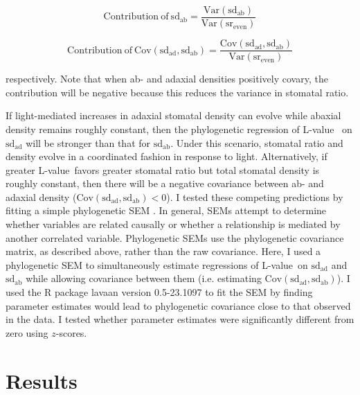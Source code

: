 \documentclass[12pt, oneside]{article}
\newcommand{\pkg}[1]{{\fontseries{b}\selectfont #1}}
\newcommand{\el}{L-value}
\begin{document}
\begin{equation} \label{eq:contribution_ab}
 \mathrm{Contribution~of~sd_{ab}} = \frac{\mathrm{Var(sd_{ab})}}{\mathrm{Var(sr_{even})}}
\end{equation}

\begin{equation} \label{eq:contribution_cov}
 \mathrm{Contribution~of~Cov(sd_{ad}, sd_{ab})} = \frac{\mathrm{Cov(sd_{ad}, sd_{ab})}}{\mathrm{Var(sr_{even})}}
\end{equation}

respectively. Note that when ab- and adaxial densities positively covary, the contribution will be negative because this reduces the variance in stomatal ratio.

If light-mediated increases in adaxial stomatal density can evolve while abaxial density remains roughly constant, then the phylogenetic regression of \el~ on $\mathrm{sd_{ad}}$ will be stronger than that for $\mathrm{sd_{ab}}$. Under this scenario, stomatal ratio and density evolve in a coordinated fashion in response to light. Alternatively, if greater \el~favors greater stomatal ratio but total stomatal density is roughly constant, then there will be a negative covariance between ab- and adaxial density ($\mathrm{Cov(sd_{ad}, sd_{ab}) < 0}$). I tested these competing predictions by fitting a simple phylogenetic SEM \citep[see][for a similar approach]{Mason_etal_2016}. In general, SEMs attempt to determine whether variables are related causally or whether a relationship is mediated by another correlated variable. Phylogenetic SEMs use the phylogenetic covariance matrix, as described above, rather than the raw covariance. Here, I used a phylogenetic SEM to simultaneously estimate regressions of \el~on $\mathrm{sd_{ad}}$ and $\mathrm{sd_{ab}}$ while allowing covariance between them (i.e. estimating $\mathrm{Cov(sd_{ad}, sd_{ab})}$). I used the R package \pkg{lavaan} version 0.5-23.1097 \citep{Rosseel_2012} to fit the SEM by finding parameter estimates would lead to phylogenetic covariance close to that observed in the data. I tested whether parameter estimates were significantly different from zero using $z$-scores.


\section*{Results}
\end{document}

